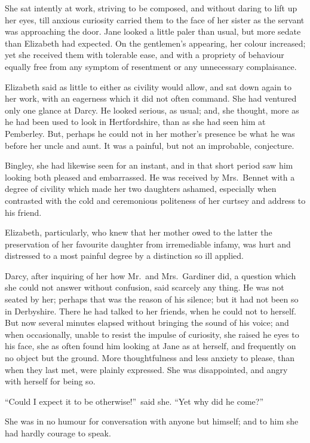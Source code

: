 \documentclass[12pt,english]{book}
\begin{document}
She sat intently at work, striving to be composed, and without daring
to lift up her eyes, till anxious curiosity carried them to the face
of her sister as the servant was approaching the door. Jane looked
a little paler than usual, but more sedate than Elizabeth had expected.
On the gentlemen's appearing, her colour increased; yet she received
them with tolerable ease, and with a propriety of behaviour equally
free from any symptom of resentment or any unnecessary complaisance.

Elizabeth said as little to either as civility would allow, and sat
down again to her work, with an eagerness which it did not often command.
She had ventured only one glance at Darcy. He looked serious, as usual;
and, she thought, more as he had been used to look in Hertfordshire,
than as she had seen him at Pemberley. But, perhaps he could not in
her mother's presence be what he was before her uncle and aunt. It
was a painful, but not an improbable, conjecture.

Bingley, she had likewise seen for an instant, and in that short period
saw him looking both pleased and embarrassed. He was received by Mrs.\ Bennet
with a degree of civility which made her two daughters ashamed, especially
when contrasted with the cold and ceremonious politeness of her curtsey
and address to his friend.

Elizabeth, particularly, who knew that her mother owed to the latter
the preservation of her favourite daughter from irremediable infamy,
was hurt and distressed to a most painful degree by a distinction
so ill applied.

Darcy, after inquiring of her how Mr.\ and Mrs.\ Gardiner did, a
question which she could not answer without confusion, said scarcely
any thing. He was not seated by her; perhaps that was the reason of
his silence; but it had not been so in Derbyshire. There he had talked
to her friends, when he could not to herself. But now several minutes
elapsed without bringing the sound of his voice; and when occasionally,
unable to resist the impulse of curiosity, she raised he eyes to his
face, she as often found him looking at Jane as at herself, and frequently
on no object but the ground. More thoughtfulness and less anxiety
to please, than when they last met, were plainly expressed. She was
disappointed, and angry with herself for being so.

{}``Could I expect it to be otherwise!''\ said she. {}``Yet why
did he come?''\ 

She was in no humour for conversation with anyone but himself; and
to him she had hardly courage to speak.
\end{document}
